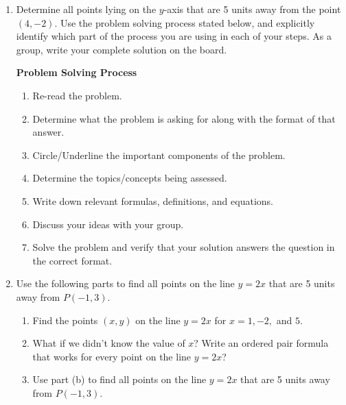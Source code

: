 \begin{enumerate}
\newpage

\item Determine all points lying on the $y$-axis that are 5 units away
  from the point $(4,-2)$.  Use the problem solving process stated
  below, and explicitly identify which part of the process you are
  using in each of your steps.  As a group, write your complete
  solution on the board.


\begin{boxthm}
{\bf Problem Solving Process}
\begin{enumerate}
\item Re-read the problem.
\item Determine what the problem is asking for along with the format of that answer.
\item Circle/Underline the important components of the problem.
\item Determine the topics/concepts being assessed.
\item Write down relevant formulas, definitions, and equations.
\item Discuss your ideas with your group.
\item Solve the problem and verify that your solution answers the question in the correct format.
\end{enumerate}

\end{boxthm}
\vfill
\newpage

\item Use the following parts to find all points on the line $y=2x$ that are 5 units away from $P(-1,3)$.  
\begin{enumerate}
\item Find the points $(x,y)$ on the line $y=2x$ for $x=1, -2,$ and $5$.
\vfill
\item What if we didn't know the value of $x$?  Write an ordered pair formula that works for every point on the line $y=2x$?\vfill
\item Use part (b) to find all points on the line $y=2x$ that are 5 units away from $P(-1,3)$. 
\vfill
\vfill
\vfill
\end{enumerate}
\newpage





\end{enumerate}





